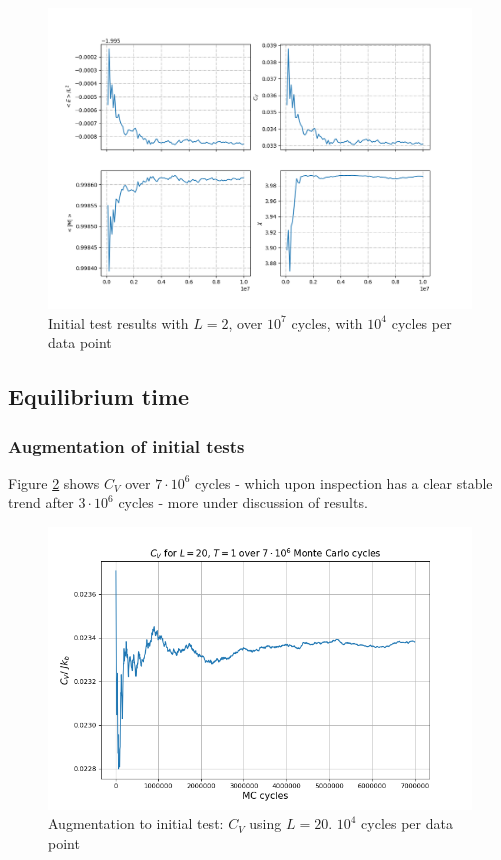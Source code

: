 \documentclass[%
oneside,                 %
final,                   %
10pt]{article}
\begin{document}
\begin{figure}[!htb]
        \centering 
         \includegraphics[scale=.5]{../Results/initial_tests.png} 
        \caption{Initial test results with $L=2$, over $10^7$ cycles, with $10^4$ cycles per data point}
        \label{fig:initial_tests}   
\end{figure}  

\subsection{Equilibrium time}
\label{SS.R.EQtime }
\subsubsection*{Augmentation of initial tests}
Figure \ref{fig:L20CV} shows $C_V$ over $7 \cdot 10^6$ cycles - which upon  inspection has a clear stable trend after $3 \cdot 10^6$ cycles  - more under discussion of results. \newline

\begin{figure}[!htb]
        \centering 
         \includegraphics[scale=.55]{../Results/L20T1_CV.png} 
        \caption{Augmentation to initial test: $C_V$ using $L=20$. $10^4$ cycles per data point}
        \label{fig:L20CV}   
\end{figure} 
\end{document}
